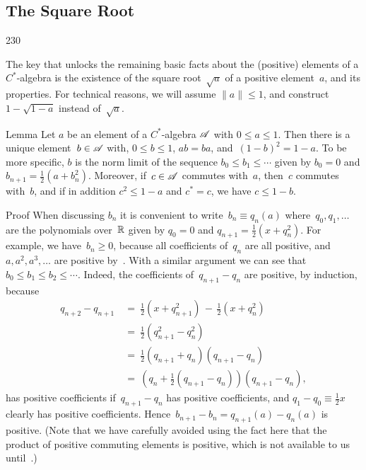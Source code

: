 \subsection{The Square Root}
\begin{parsec}{230}%
\begin{point}{10}%
The key that unlocks the remaining basic facts 
about the (positive) elements of a  $C^*$-algebra
is the existence of the square root~$\sqrt{a}$ of a positive element~$a$,
and its properties.
For technical reasons,
we will assume $\|a\|\leq 1$,
and construct
 $1-\sqrt{1-a}$ instead of~$\sqrt{a}$.
\end{point}
\begin{point}{20}{Lemma}%
Let $a$ be an element of a $C^*$-algebra $\mathscr{A}$
with $0\leq a\leq 1$.
Then there is a unique element~$b\in\mathscr{A}$ 
with, $0\leq b\leq 1$,
$ab=ba$,
and~$(1-b)^2 = 1-a$.
To be more specific,
$b$ is the norm limit of
the sequence $b_0\leq b_1\leq \dotsb$
given by $b_0=0$ and $b_{n+1} = \frac{1}{2}(a+b_n^2)$.
Moreover,
if~$c\in\mathscr{A}$ commutes with~$a$, then~$c$ commutes with~$b$,
and if in addition $c^2\leq 1-a$ and $c^*=c$,
we have $c\leq 1-b$.
\begin{point}{30}{Proof}%
When discussing $b_n$ it 
is convenient to write~$b_n \equiv q_n(a)$
where~$q_0,q_1,\dotsc$ are the polynomials over~$\mathbb{R}$ given by
$q_0=0$ and $q_{n+1}=\frac{1}{2}(x + q_n^2)$.
For example,
we have~$b_n\geq 0$, 
because all coefficients of~$q_n$ are all positive,
and $a,a^2,a^3,\dotsc$ are positive by~.
With a similar argument we can see that
 $b_0 \leq b_1\leq b_2\leq \dotsb$.
Indeed, 
the coefficients of~$q_{n+1}-q_n$
are positive,
by induction,
because
\begin{alignat*}{3}
q_{n+2}-q_{n+1} \ &=\ \textstyle \frac{1}{2}(x+ q_{n+1}^2)
\,-\, \textstyle\frac{1}{2}(x+q_n^2) \\
&=\ \textstyle\frac{1}{2}(q_{n+1}^2- q_n^2) \\
&=\ \textstyle\frac{1}{2}(q_{n+1}+q_n)(q_{n+1}-q_n) \\
&=\ (q_n+\textstyle\frac{1}{2}(q_{n+1}-q_n))(q_{n+1}-q_n),
\end{alignat*}
has positive coefficients
if~$q_{n+1}-q_n$ has positive coefficients,
and $q_1-q_0\equiv \frac{1}{2}x$ clearly has positive coefficients.
Hence~$b_{n+1}-b_{n} = q_{n+1}(a)- q_n(a)$ is positive.
(Note that we have carefully avoided
using the fact here that the product of positive 
commuting elements is positive,
which is not available to us until~.)


\end{point}
\end{point}
\end{parsec}
